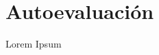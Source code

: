 \centering
\thispagestyle{fancy}
\fancyfoot{}
\fancyhead{}
\renewcommand{\headrulewidth}{0pt}
\vspace*{\fill}
\section*{Autoevaluaci\'{o}n}
\justify
\noindent
Lorem Ipsum

\vspace*{\fill}
\newpage